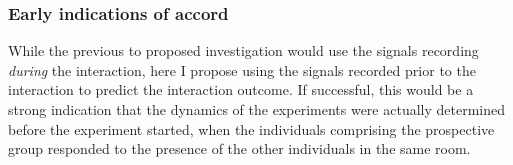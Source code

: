 \documentclass[a4paper, 11pt]{article}      %
\begin{document}
\subsubsection{Early indications of accord}
While the previous to proposed investigation would use the signals recording \emph{during} the interaction, here I propose using the signals recorded prior to the interaction to predict the interaction outcome. If successful, this would be a strong indication that the dynamics of the experiments were actually determined before the experiment started, when the individuals comprising the prospective group responded to the presence of the other individuals in the same room.


\subsection{}
\end{document}
